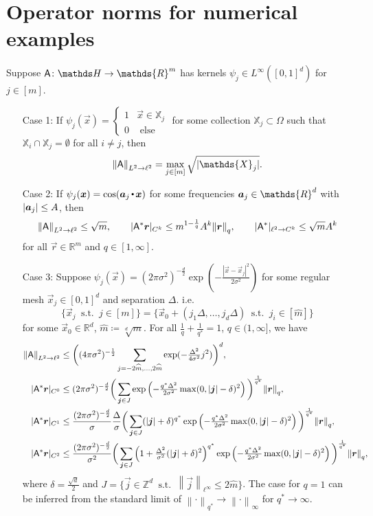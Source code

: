 \documentclass[smallextended]{svjour3}
\let\F\mathds\let\C\mathcal\newcommand{\R}{\F{R}}\newcommand{\A}{\tens{A}}
\newcommand{\norm}[1]{{\left\lVert #1 \right\rVert}}
\newcommand{\ip}[2]{#1 \vcenter{\hbox{\resizebox{6pt}{!}{\ensuremath\cdot}}} #2}
\newcommand{\splitln}[4]{\begin{cases} #1 & #2 \\ #3 & #4\end{cases}}
\newcommand{\1}{\F{1}}
\DeclareMathOperator{\st}{\;s.t.\;}
\renewcommand{\hat}{\widehat}\renewcommand{\tilde}{\widetilde}
\newcommand{\Domain}{\Omega}\newcommand{\domain}{\omega}
\newcommand*{\vars}[1]{%
	\IfEqCase{#1}{%
		{0}{\alpha}%
		{1}{\beta}%
		{2}{\gamma}%
		{3}{a}%
		{4}{b}%
		{5}{c}%
	}[k#1]%
}
\newcommand*{\vvars}[1]{\vec{\vars{#1}}}
\begin{document}
	
	\section{Operator norms for numerical examples}
	\begin{theorem}\label{thm: norm bound examples}
			Suppose $\A\colon \F H \to \R^m$ has kernels $\psi_j\in L^\infty([0,1]^d)$ for $j\in[m]$.
		\begin{enumerate}
			\item[Case 1:] If $\psi_j(\vec{x}) = \splitln{1}{\vec{x}\in \F{X}_j}{0}{\text{ else}}$ for some collection $\F{X}_j\subset\Domain$ such that $\F{X}_i\cap \F{X}_j = \emptyset$ for all $i\neq j$, then 
			$$\norm{\A}_{L^2\to\ell^2} = \max_{j\in[m]} \sqrt{|\F{X}_j|}.$$
			
			\item[Case 2:] If $\psi_j(\vec{x}) = \cos(\ip{\vvars3_j}{\vec{x}})$ for some frequencies $\vvars3_j\in\R^d$ with $|\vvars3_j|\leq A$, then
			$$\norm{\A}_{L^2\to\ell^2} \leq \sqrt{m}, \qquad |\A^*\vec{r}|_{C^k}\leq m^{1-\frac1q}A^k\norm{\vec{r}}_q, \qquad |\A^*|_{\ell^2\to C^k}\leq \sqrt{m}A^k$$
			for all $\vec{r}\in\R^m$ and $q\in[1,\infty]$.
			
			\item[Case 3:] Suppose $\psi_j(\vec{x}) = (2\pi\sigma^2)^{-\frac{d}{2}}\exp\left(-\frac{|\vec{x}-\vec{x}_j|^2}{2\sigma^2}\right)$ for some regular mesh $\vec{x}_j\in[0,1]^d$ and separation $\Delta$. i.e. 
			$$\{\vec{x}_j\st j\in[m]\} = \{\vec{x}_0 + (j_1\Delta,\ldots,j_d\Delta)\st j_i\in[\hat m]\}$$
			for some $\vec{x}_0\in\R^d$, $\hat m\coloneqq\sqrt[d]{m}$. For all $\frac1q + \frac{1}{q^*} = 1$, $q\in(1,\infty]$, we have
			\begin{align}
				\norm{\A}_{L^2\to\ell^2} &\leq \bigg((4\pi\sigma^2)^{-\frac 12}\sum_{j=-2\hat m,\ldots,2\hat m}\exp(-\tfrac{\Delta^2}{4\sigma^2}j^2)\bigg)^d,
				\\ |\A^*\vec{r}|_{C^0} &\leq (2\pi\sigma^2)^{-\frac{d}{2}}\bigg(\sum_{\vec j\in J}\exp\left(-\tfrac{q^*\Delta^2}{2\sigma^2}\max(0,|\vec j|-\delta)^2\right)\bigg)^{\frac1{q^*}}\norm{\vec{r}}_q,
				\\ |\A^*\vec{r}|_{C^1} &\leq \frac{(2\pi\sigma^2)^{-\frac{d}{2}}}{\sigma}\frac{\Delta}{\sigma}\bigg(\sum_{\vec j\in J}(|\vec j|+\delta)^{q^*}\exp\left(-\tfrac{q^*\Delta^2}{2\sigma^2}\max(0,|\vec j|-\delta)^2\right)\bigg)^{\frac1{q^*}}\norm{\vec{r}}_q,
				\\ |\A^*\vec{r}|_{C^2} &\leq \frac{(2\pi\sigma^2)^{-\frac{d}{2}}}{\sigma^2} \bigg(\sum_{\vec j\in J} \left(1+\tfrac{\Delta^2}{\sigma^2}(|\vec j|+\delta)^2\right)^{q^*}\exp\left(-\tfrac{q^*\Delta^2}{2\sigma^2}\max(0,|\vec j|-\delta)^2\right)\bigg)^{\frac1{q^*}} \norm{\vec{r}}_q,
			\end{align}
			where $\delta= \frac{\sqrt d}{2}$ and $J=\{\vec j\in\F Z^d \st \norm{\vec j}_{\ell^\infty}\leq 2\hat m\}$. The case for $q=1$ can be inferred from the standard limit of $\norm\cdot_{{q^*}}\to \norm\cdot_{\infty}$ for $q^*\to\infty$.
		\end{enumerate}
	\end{theorem}
\end{document}
